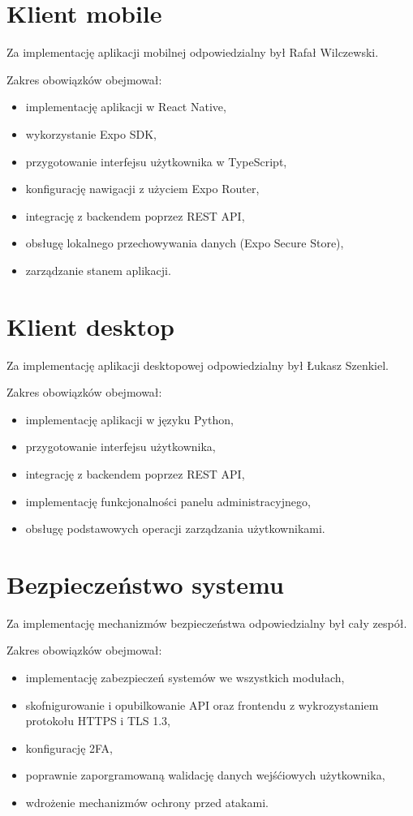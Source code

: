 \section{Klient mobile}

Za implementację aplikacji mobilnej odpowiedzialny był Rafał Wilczewski.

Zakres obowiązków obejmował:
\begin{itemize}
	\item implementację aplikacji w React Native,
	\item wykorzystanie Expo SDK,
	\item przygotowanie interfejsu użytkownika w TypeScript,
	\item konfigurację nawigacji z użyciem Expo Router,
	\item integrację z backendem poprzez REST API,
	\item obsługę lokalnego przechowywania danych (Expo Secure Store),
	\item zarządzanie stanem aplikacji.
\end{itemize}

\section{Klient desktop}

Za implementację aplikacji desktopowej odpowiedzialny był Łukasz Szenkiel.

Zakres obowiązków obejmował:
\begin{itemize}
	\item implementację aplikacji w języku Python,
	\item przygotowanie interfejsu użytkownika,
	\item integrację z backendem poprzez REST API,
	\item implementację funkcjonalności panelu administracyjnego,
	\item obsługę podstawowych operacji zarządzania użytkownikami.
\end{itemize}

\section{Bezpieczeństwo systemu}

Za implementację mechanizmów bezpieczeństwa odpowiedzialny był cały zespół.

Zakres obowiązków obejmował:
\begin{itemize}
	\item implementację zabezpieczeń systemów we wszystkich modułach,
	\item skofnigurowanie i opubilkowanie API oraz frontendu z wykrozystaniem protokołu HTTPS i TLS 1.3,
	\item konfigurację 2FA,
	\item poprawnie zaporgramowaną walidację danych wejśćiowych użytkownika,
	\item wdrożenie mechanizmów ochrony przed atakami.
\end{itemize}

